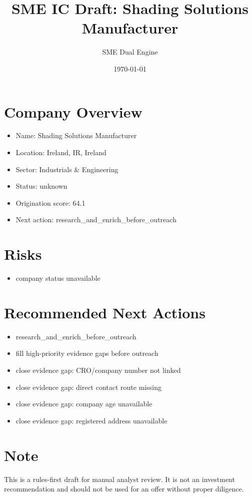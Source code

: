 \documentclass[11pt,a4paper]{article}
\title{SME IC Draft: Shading Solutions Manufacturer}
\author{SME Dual Engine}
\date{\today}
\begin{document}
\maketitle
\section*{Company Overview}
\begin{itemize}[leftmargin=1.4em]
\item Name: Shading Solutions Manufacturer
\item Location: Ireland, IR, Ireland
\item Sector: Industrials \& Engineering
\item Status: unknown
\item Origination score: 64.1
\item Next action: research\_and\_enrich\_before\_outreach
\end{itemize}
\section*{Risks}
\begin{itemize}[leftmargin=1.4em]
\item company status unavailable
\end{itemize}
\section*{Recommended Next Actions}
\begin{itemize}[leftmargin=1.4em]
\item research\_and\_enrich\_before\_outreach
\item fill high-priority evidence gaps before outreach
\item close evidence gap: CRO/company number not linked
\item close evidence gap: direct contact route missing
\item close evidence gap: company age unavailable
\item close evidence gap: registered address unavailable
\end{itemize}
\section*{Note}
This is a rules-first draft for manual analyst review. It is not an investment
recommendation and should not be used for an offer without proper diligence.
\end{document}
